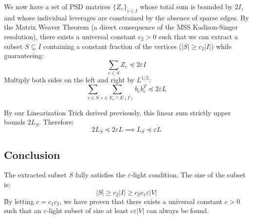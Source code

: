 \documentclass[12pt]{article}
\begin{document}
We now have a set of PSD matrices $\{Z_v\}_{v \in I}$ whose total sum is bounded by $2I$, and whose individual leverages are constrained by the absence of sparse edges. By the Matrix Weaver Theorem (a direct consequence of the MSS Kadison-Singer resolution), there exists a universal constant $c_2 > 0$ such that we can extract a subset $S \subseteq I$ containing a constant fraction of the vertices ($|S| \ge c_2 |I|$) while guaranteeing:
\[
\sum_{v \in S} Z_v \preceq 2 \varepsilon I
\]
Multiply both sides on the left and right by $L^{1/2}$:
\[
\sum_{v \in S} \sum_{e \in E_v \cap E(I)} b_e b_e^T \preceq 2 \varepsilon L
\]

By our Linearization Trick derived previously, this linear sum strictly upper bounds $2L_S$. Therefore:
\[
2 L_S \preceq 2 \varepsilon L \implies L_S \preceq \varepsilon L
\]

\subsection{Conclusion}
The extracted subset $S$ fully satisfies the $\varepsilon$-light condition. The size of the subset is: 
\[
|S| \ge c_2 |I| \ge c_2 c_1 \varepsilon |V|
\]
By letting $c = c_1 c_2$, we have proven that there exists a universal constant $c > 0$ such that an $\varepsilon$-light subset of size at least $c \varepsilon |V|$ can always be found. \qedsymbol
\end{document}
